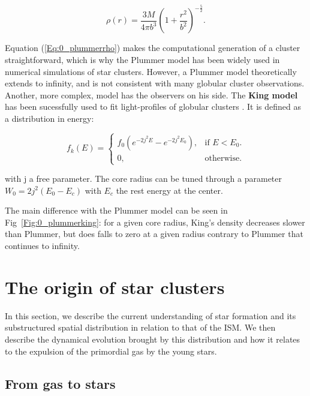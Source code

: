 \begin{equation}
\label{Eq:0_plummerrho}
\rho(r) = \frac{3 M}{4 \pi b^3} \left( 1 + \frac{r^2}{b^2} \right) ^{- \frac{5}{2}}.
\end{equation}

Equation (\ref{Eq:0_plummerrho}) makes the computational generation of a cluster straightforward, which is why the Plummer model has been widely used in numerical simulations of star clusters.
However, a Plummer model theoretically extends to infinity, and is not consistent with many globular cluster observations. Another, more complex, model has the observers on his side. The \textbf{King model} has been sucessfully used to fit light-profiles of globular clusters \citep{King1981}. It is defined as a distribution in energy:

\begin{equation}
  f_k(E)=\begin{cases}
    f_0 \left(e^{-2j^2E} - e^{-2j^2E_0}\right)  , & \text{if $E<E_0$}.\\
    0, & \text{otherwise}.
  \end{cases}
\end{equation}

with j a free parameter. The core radius can be tuned through a parameter $W_0 =2j^2(E_0 - E_c)$ with $E_c$ the rest energy at the center. 

The main difference with the Plummer model can be seen in Fig~\ref{Fig:0_plummerking}: for a given core radius, King's density decreases slower than Plummer, but does falls to zero at a given radius contrary to Plummer that continues to infinity.






\section{The origin of star clusters}

In this section, we describe the current understanding of star formation and its substructured spatial distribution in relation to that of the ISM. We then describe the dynamical evolution brought by this distribution and how it relates to the expulsion of the primordial gas by the young stars.


\subsection{From gas to stars}

